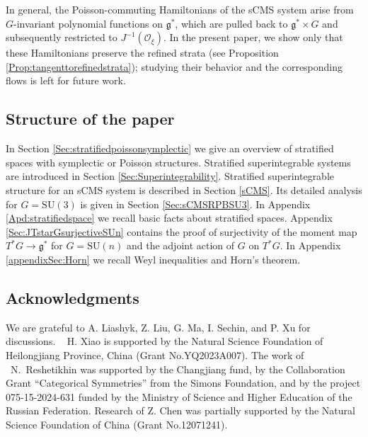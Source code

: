 \documentclass[12pt]{amsart}
\theoremstyle{definition}
\numberwithin{equation}{section}
\newcommand{\SU}{\mathrm{SU}}
\begin{document}
 
 In general, the Poisson-commuting Hamiltonians of the sCMS system arise from \(G\)-invariant polynomial functions on \(\mathfrak{g}^*\), which are pulled back to \(\mathfrak{g}^*\times G\) and subsequently restricted to \(J^{-1}(\mathcal{O}_\xi)\). In the present paper, we show only that these Hamiltonians preserve the refined strata (see Proposition \ref{Prop:tangenttorefinedstrata}); studying their behavior and the corresponding flows is left for future work.

\subsection{Structure of the paper} 
In Section \ref{Sec:stratifiedpoissonsymplectic} we give an overview of stratified spaces with symplectic or Poisson structures. Stratified superintegrable systems are introduced in Section \ref{Sec:Superintegrability}. Stratified superintegrable structure for an sCMS system is described in Section \ref{sCMS}. Its detailed analysis for $G=\SU(3)$ is given in Section \ref{Sec:sCMSRPBSU3}. In Appendix \ref{Apd:stratifiedspace} we recall basic facts about stratified spaces. Appendix \ref{Sec:JTstarGsurjectiveSUn} contains the proof of surjectivity of the moment map $T^*G\to \mathfrak{g}^*$ for $G=\SU(n)$ and the adjoint action of $G$ on $T^*G$. In Appendix \ref{appendixSec:Horn} we recall Weyl inequalities and Horn's theorem. 





\subsection{Acknowledgments} We are grateful to A. Liashyk, Z. Liu, G. Ma,  I. Sechin, and P. Xu for discussions. ~ H. Xiao is   supported by the Natural Science Foundation of Heilongjiang Province, China (Grant
No.YQ2023A007). The work
of  ~N.~Reshetikhin  was supported by the Changjiang fund, by the Collaboration Grant ``Categorical Symmetries'' from
the Simons Foundation, and by the project 075-15-2024-631 funded
by the Ministry of Science and Higher Education of the Russian Federation. Research of Z. Chen was partially supported by the Natural Science Foundation of China (Grant
No.12071241).
  
\end{document}
